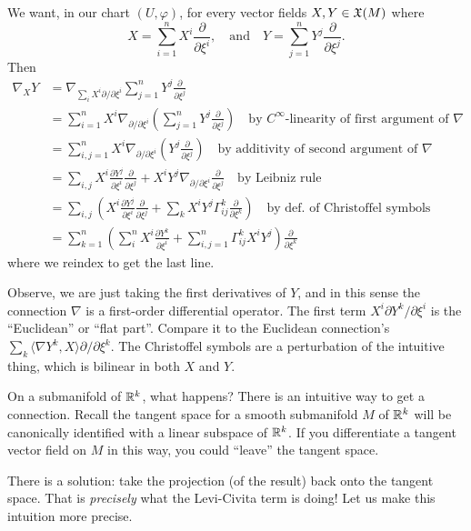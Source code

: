 \begin{remark}
We want, in our chart $(U,\varphi)$, for every vector fields $X,Y\in\mathfrak{X}(M)$
where
\begin{equation}
X=\sum^{n}_{i=1}X^{i}\frac{\partial}{\partial\xi^{i}},\quad\mbox{and}\quad
Y=\sum^{n}_{j=1}Y^{j}\frac{\partial}{\partial\xi^{j}}.
\end{equation}
Then
\begin{subequations}
  \begin{align}
\nabla_{X}Y &= \nabla_{\sum_{i}X^{i}\partial/\partial\xi^{i}}\sum^{n}_{j=1}Y^{j}\frac{\partial}{\partial\xi^{j}}\\
&=\sum^{n}_{i=1}X^{i}\nabla_{\partial/\partial\xi^{i}}\left(\sum^{n}_{j=1}Y^{j}\frac{\partial}{\partial\xi^{j}}\right)\quad\mbox{by $C^{\infty}$-linearity of first argument of $\nabla$}\\
&=\sum^{n}_{i,j=1}X^{i}\nabla_{\partial/\partial\xi^{i}}\left(Y^{j}\frac{\partial}{\partial\xi^{j}}\right)
\quad\mbox{by additivity of second argument of $\nabla$}\\
&=\sum_{i,j}X^{i}\frac{\partial Y^{j}}{\partial\xi^{i}}\frac{\partial}{\partial\xi^{j}}+X^{i}Y^{j}\nabla_{\partial/\partial\xi^{i}}\frac{\partial}{\partial\xi^{j}}
\quad\mbox{by Leibniz rule}\\
&=\sum_{i,j}\left(X^{i}\frac{\partial Y^{j}}{\partial\xi^{i}}\frac{\partial}{\partial\xi^{j}}+\sum_{k}X^{i}Y^{j}\Gamma^{k}_{ij}\frac{\partial}{\partial\xi^{k}}\right)\quad\mbox{by def.\ of Christoffel symbols}\\
&=\sum_{k=1}^{n}\left(\sum^{n}_{i}X^{i}\frac{\partial Y^{k}}{\partial\xi^{i}}+\sum^{n}_{i,j=1}\Gamma^{k}_{ij}X^{i}Y^{j}\right)\frac{\partial}{\partial\xi^{k}}
  \end{align}
\end{subequations}
where we reindex to get the last line.

Observe, we are just taking the first derivatives of $Y$, and in this
sense the connection $\nabla$ is a first-order differential
operator. The first term $X^{i}\partial Y^{k}/\partial\xi^{i}$ is the
``Euclidean'' or ``flat part''. Compare it to the Euclidean
connection's $\sum_{k}\langle\nabla Y^{k},X\rangle\partial/\partial\xi^{k}$.
The Christoffel symbols are a perturbation of the intuitive thing,
which is bilinear in both $X$ and $Y$.
\end{remark}

\begin{node}
On a submanifold of $\mathbb{R}^{k}$, what happens? There is an intuitive way
to get a connection. Recall the tangent space for a smooth submanifold
$M$ of $\mathbb{R}^{k}$ will be canonically identified with a linear subspace
of $\mathbb{R}^{k}$. If you differentiate a tangent vector field on $M$ in
this way, you could ``leave'' the tangent space.

There is a solution: take the projection (of the result) back onto the
tangent space. That is \emph{precisely} what the Levi-Civita term is
doing! Let us make this intuition more precise.
\end{node}

